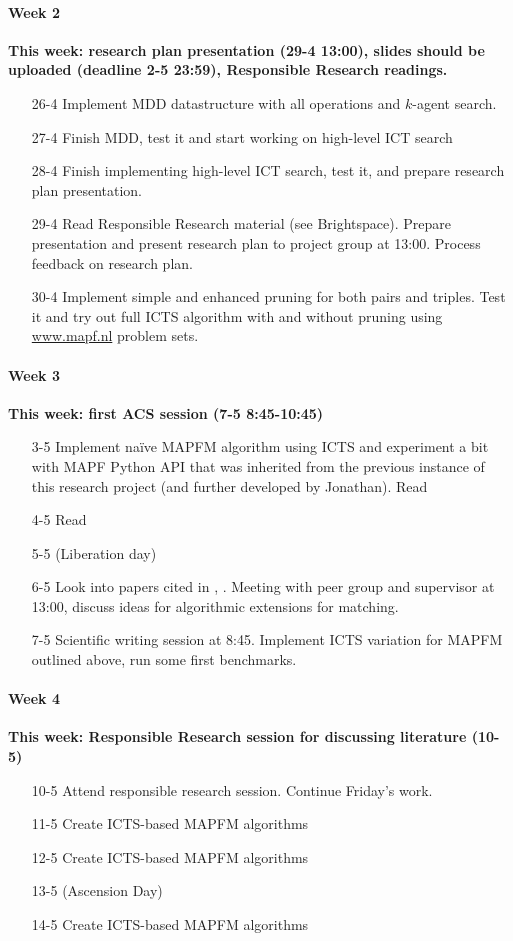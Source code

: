\documentclass[a4paper,10pt,english]{article}
\begin{document}
	\paragraph{Week 2} \textbf{This week: research plan presentation (29-4 13:00), slides should be uploaded (deadline 2-5 23:59), Responsible Research readings.}
	\begin{enumerate}
		\item[26-4 ] Implement MDD datastructure with all operations and $k$-agent search.
		\item[27-4 ] Finish MDD, test it and start working on high-level ICT search
		\item[28-4 ] Finish implementing high-level ICT search, test it, and prepare research plan presentation.
		\item[29-4 ] Read Responsible Research material (see Brightspace). Prepare presentation and present research plan to project group at 13:00. Process feedback on research plan.
		\item[30-4 ] Implement simple and enhanced pruning for both pairs and triples. Test it and try out full ICTS algorithm with and without pruning using \url{www.mapf.nl} problem sets.
	\end{enumerate}
	\paragraph{Week 3} \textbf{This week: first ACS session (7-5 8:45-10:45)}
	\begin{enumerate}
		\item[3-5 ] Implement naïve MAPFM algorithm using ICTS and experiment a bit with MAPF Python API that was inherited from the previous instance of this research project (and further developed by Jonathan). Read \cite{ma2016}
		\item[4-5 ] Read \cite{henkel2019}
		\item[5-5 ] (Liberation day)
		\item[6-5 ] Look into papers cited in \cite{ma2016}, \cite{henkel2019}. Meeting with peer group and supervisor at 13:00, discuss ideas for algorithmic extensions for matching.
		\item[7-5 ] Scientific writing session at 8:45. Implement ICTS variation for MAPFM outlined above, run some first benchmarks.
	\end{enumerate}
	\paragraph{Week 4} \textbf{This week: Responsible Research session for discussing literature (10-5)}
	\begin{enumerate}
		\item[10-5 ] Attend responsible research session. Continue Friday's work.
		\item[11-5 ] Create ICTS-based MAPFM algorithms
		\item[12-5 ] Create ICTS-based MAPFM algorithms
		\item[13-5 ] (Ascension Day)
		\item[14-5 ] Create ICTS-based MAPFM algorithms
	\end{enumerate}
\end{document}
